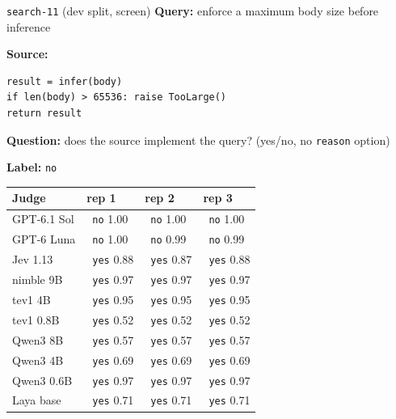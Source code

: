 \documentclass[11pt,letterpaper]{article}
\newcommand{\symok}{\textcolor{okgreen}{\ding{51}}}
\newcommand{\symbad}{\textcolor{okorange}{\ding{55}}}
\begin{document}
\begin{casecard}{\texttt{search-11} (dev split, screen)}
\textbf{Query:} enforce a maximum body size before inference\par\smallskip
\textbf{Source:}\par
\begin{lstlisting}
result = infer(body)
if len(body) > 65536: raise TooLarge()
return result
\end{lstlisting}
\textbf{Question:} does the source implement the query? (yes/no, no \texttt{reason} option)\par
\textbf{Label:} \texttt{no}\par\smallskip
{\small\begin{tabular*}{\linewidth}{@{\extracolsep{\fill}}l l l l@{}}\toprule
Judge & rep 1 & rep 2 & rep 3 \\ \midrule
GPT-6.1 Sol & \symok\ \texttt{no} 1.00 & \symok\ \texttt{no} 1.00 & \symok\ \texttt{no} 1.00 \\
GPT-6 Luna & \symok\ \texttt{no} 1.00 & \symok\ \texttt{no} 0.99 & \symok\ \texttt{no} 0.99 \\
Jev 1.13 & \symbad\ \texttt{yes} 0.88 & \symbad\ \texttt{yes} 0.87 & \symbad\ \texttt{yes} 0.88 \\
nimble 9B & \symbad\ \texttt{yes} 0.97 & \symbad\ \texttt{yes} 0.97 & \symbad\ \texttt{yes} 0.97 \\
tev1 4B & \symbad\ \texttt{yes} 0.95 & \symbad\ \texttt{yes} 0.95 & \symbad\ \texttt{yes} 0.95 \\
tev1 0.8B & \symbad\ \texttt{yes} 0.52 & \symbad\ \texttt{yes} 0.52 & \symbad\ \texttt{yes} 0.52 \\
Qwen3 8B & \symbad\ \texttt{yes} 0.57 & \symbad\ \texttt{yes} 0.57 & \symbad\ \texttt{yes} 0.57 \\
Qwen3 4B & \symbad\ \texttt{yes} 0.69 & \symbad\ \texttt{yes} 0.69 & \symbad\ \texttt{yes} 0.69 \\
Qwen3 0.6B & \symbad\ \texttt{yes} 0.97 & \symbad\ \texttt{yes} 0.97 & \symbad\ \texttt{yes} 0.97 \\
Laya base & \symbad\ \texttt{yes} 0.71 & \symbad\ \texttt{yes} 0.71 & \symbad\ \texttt{yes} 0.71 \\
\bottomrule\end{tabular*}}
\end{casecard}
\end{document}
